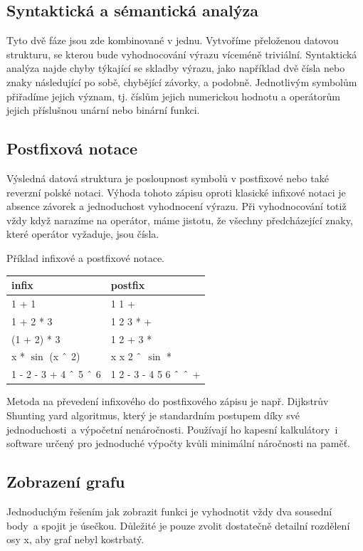 \documentclass[11pt]{article}
\newcommand\CARET{\mathbin{\char`\^}}
\begin{document}
\subsection{Syntaktická a sémantická analýza}
Tyto dvě fáze jsou zde kombinované v jednu. Vytvoříme přeloženou datovou
strukturu, se kterou bude vyhodnocování výrazu víceméně triviální. Syntaktická
analýza najde chyby týkající se skladby výrazu, jako například dvě čísla nebo
znaky následující po sobě, chybějící závorky, a podobně. Jednotlivým symbolům
přiřadíme jejich význam, tj. číslům jejich numerickou hodnotu a operátorům
jejich příslušnou unární nebo binární funkci. 

\subsection{Postfixová notace}
Výsledná datová struktura je posloupnost symbolů v postfixové nebo také
reverzní polské notaci. Výhoda tohoto zápisu oproti klasické infixové notaci
je absence závorek a jednoduchost vyhodnocení výrazu. Při vyhodnocování totiž
vždy když narazíme na operátor, máme jistotu, že všechny předcházející znaky, 
které operátor vyžaduje, jsou čísla.

Příklad infixové a postfixové notace.
\begin{center}
\begin{tabular}{|l|l|}
\hline
infix & postfix \\
\hline
1 + 1 & 1 1 + \\
1 + 2 * 3 & 1 2 3 * + \\
(1 + 2) * 3 & 1 2 + 3 * \\
x * $\sin$ (x $\CARET$ 2) & x x 2 $\CARET$ $\sin$ * \\
1 - 2 - 3 + 4 $\CARET$ 5 $\CARET$ 6 & 1 2 - 3 - 4 5 6 $\CARET$ $\CARET$ + \\
\hline
\end{tabular}
\end{center}

Metoda na převedení infixového do postfixového zápisu je např. Dijkstrův
Shunting yard algoritmus\cite{wikiShunting}\cite{shewchuk}, který je
standardním postupem díky své jednoduchosti~a výpočetní nenáročnosti. Používají
ho kapesní kalkulátory~i software určený pro jednoduché výpočty kvůli minimální
náročnosti na paměť.



\subsection{Zobrazení grafu}
Jednoduchým řešením jak zobrazit funkci je vyhodnotit vždy dva sousední body~a
spojit je úsečkou. Důležité je pouze zvolit dostatečně detailní rozdělení osy
x, aby graf nebyl kostrbatý.
\end{document}
